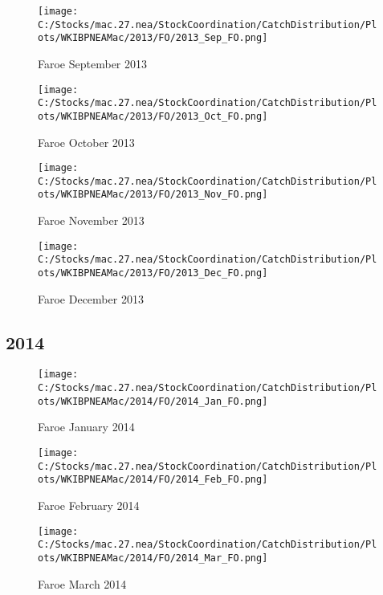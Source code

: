 \documentclass{article}
\begin{document}
\begin{figure}
	\centering
		\texttt{[image: C:/Stocks/mac.27.nea/StockCoordination/CatchDistribution/Plots/WKIBPNEAMac/2013/FO/2013\_Sep\_FO.png]}
	\caption{Faroe September 2013}
	\label{fig:2013_Sep_FO}
\end{figure}

\begin{figure}
	\centering
		\texttt{[image: C:/Stocks/mac.27.nea/StockCoordination/CatchDistribution/Plots/WKIBPNEAMac/2013/FO/2013\_Oct\_FO.png]}
	\caption{Faroe October 2013}
	\label{fig:2013_Oct_FO}
\end{figure}

\begin{figure}
	\centering
		\texttt{[image: C:/Stocks/mac.27.nea/StockCoordination/CatchDistribution/Plots/WKIBPNEAMac/2013/FO/2013\_Nov\_FO.png]}
	\caption{Faroe November 2013}
	\label{fig:2013_Nov_FO}
\end{figure}

\begin{figure}
	\centering
		\texttt{[image: C:/Stocks/mac.27.nea/StockCoordination/CatchDistribution/Plots/WKIBPNEAMac/2013/FO/2013\_Dec\_FO.png]}
	\caption{Faroe December 2013}
	\label{fig:2013_Dec_FO}
\end{figure}

\clearpage

\newpage

\subsection{2014}



\begin{figure}[h]
	\centering
		\texttt{[image: C:/Stocks/mac.27.nea/StockCoordination/CatchDistribution/Plots/WKIBPNEAMac/2014/FO/2014\_Jan\_FO.png]}
	\caption{Faroe January 2014}
	\label{fig:2014_Jan_FO}
\end{figure}

\begin{figure}
	\centering
		\texttt{[image: C:/Stocks/mac.27.nea/StockCoordination/CatchDistribution/Plots/WKIBPNEAMac/2014/FO/2014\_Feb\_FO.png]}
	\caption{Faroe February 2014}
	\label{fig:2014_Feb_FO}
\end{figure}

\begin{figure}
	\centering
		\texttt{[image: C:/Stocks/mac.27.nea/StockCoordination/CatchDistribution/Plots/WKIBPNEAMac/2014/FO/2014\_Mar\_FO.png]}
	\caption{Faroe March 2014}
	\label{fig:2014_Mar_FO}
\end{figure}
\end{document}
